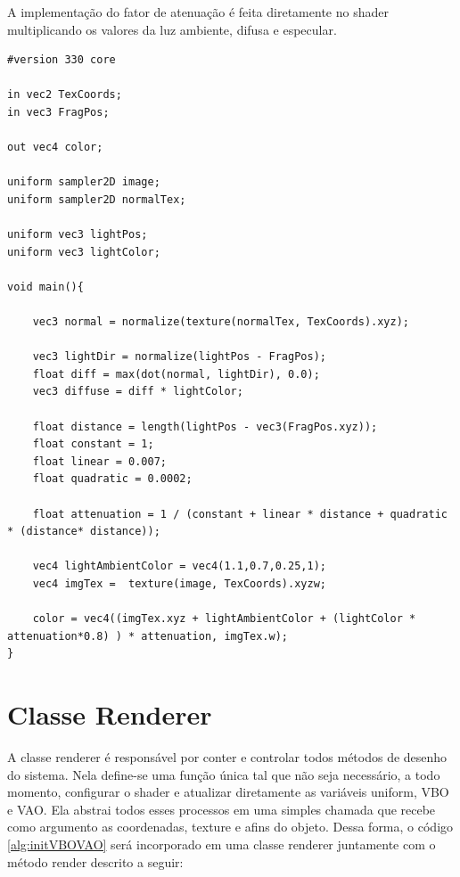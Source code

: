 \documentclass[12pt, 
openright, 
oneside, 
a4paper,    
brazil]{facom-ufu-abntex2}
\begin{document}
A implementação do fator de atenuação é feita diretamente no shader multiplicando os valores da luz ambiente, difusa e especular.

\begin{lstlisting}[caption={Fragment Shader com luz ambiente, difusa e atenuação}]
#version 330 core

in vec2 TexCoords;
in vec3 FragPos;  

out vec4 color;

uniform sampler2D image;
uniform sampler2D normalTex;

uniform vec3 lightPos; 
uniform vec3 lightColor;

void main(){

	vec3 normal = normalize(texture(normalTex, TexCoords).xyz);

	vec3 lightDir = normalize(lightPos - FragPos);
	float diff = max(dot(normal, lightDir), 0.0);
	vec3 diffuse = diff * lightColor;
	
	float distance = length(lightPos - vec3(FragPos.xyz));
	float constant = 1;
	float linear = 0.007;
	float quadratic = 0.0002;
	
	float attenuation = 1 / (constant + linear * distance + quadratic * (distance* distance));
	
	vec4 lightAmbientColor = vec4(1.1,0.7,0.25,1);
	vec4 imgTex =  texture(image, TexCoords).xyzw;
	
	color = vec4((imgTex.xyz + lightAmbientColor + (lightColor * attenuation*0.8) ) * attenuation, imgTex.w);
}
\end{lstlisting}

\section{Classe Renderer}
A classe renderer é responsável por conter e controlar todos métodos de desenho do sistema. Nela define-se uma função única tal que não seja necessário, a todo momento, configurar o shader e atualizar diretamente as variáveis uniform, VBO e VAO. Ela abstrai todos esses processos em uma simples chamada que recebe como argumento as coordenadas, texture e afins do objeto. Dessa forma, o código \ref{alg:initVBOVAO} será incorporado em uma classe renderer juntamente com o método render descrito a seguir:
\end{document}
